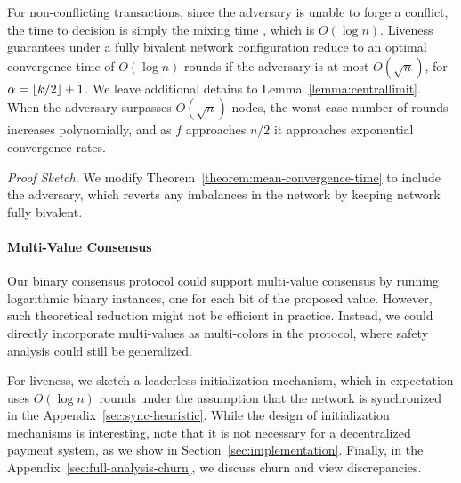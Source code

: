\documentclass[letterpaper,twocolumn,10pt]{article}
\DeclarePairedDelimiter{\floor}{\lfloor}{\rfloor}
\newcommand{\Oh}[1]{O(#1)}
\theoremstyle{definition}
\begin{document}
For non-conflicting transactions, since the adversary is unable to forge a conflict, the time to decision is simply the mixing time , which is $\Oh{\log{n}}$.
Liveness guarantees under a fully bivalent network configuration reduce to an optimal convergence time of $\Oh{\log{n}}$ rounds if the adversary is at most $\Oh{\sqrt{n}}$, for $\alpha = \floor{k/2} + 1$. We leave additional detains to Lemma~\ref{lemma:centrallimit}.
When the adversary surpasses $\Oh{\sqrt{n}}$ nodes, the worst-case number of rounds increases polynomially, and as $f$ approaches $n/2$ it approaches exponential convergence rates.

\noindent\emph{Proof Sketch.} We modify Theorem~\ref{theorem:mean-convergence-time} to include the adversary, which reverts any imbalances in the network by keeping network fully bivalent. 

\paragraph{Multi-Value Consensus}
Our binary consensus protocol could support multi-value consensus by running logarithmic binary instances, one for each bit of the proposed value. However, such theoretical reduction might not be efficient in practice. Instead, we could directly incorporate multi-values as multi-colors in the protocol, where safety analysis could still be generalized.

For liveness, we sketch a leaderless initialization mechanism, which in expectation uses $\Oh{\log{n}}$ rounds under the assumption that the network is synchronized in the Appendix~\ref{sec:sync-heuristic}. 
While the design of initialization mechanisms is interesting, note that it is not necessary for a decentralized payment system, as we show in Section~\ref{sec:implementation}.
Finally, in the Appendix~\ref{sec:full-analysis-churn}, we discuss churn and view discrepancies.
\end{document}
